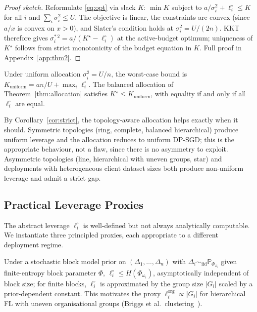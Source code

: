 \begin{proof}[Proof sketch]
Reformulate \eqref{eq:opt} via slack $K$:
$\min K$ subject to $a/\sigma_i^2 + \ell_i^\circ \leq K$ for all $i$
and $\sum_i \sigma_i^2 \leq U$. The objective is linear, the constraints
are convex (since $a/x$ is convex on $x>0$), and Slater's condition
holds at $\sigma_i^2 = U/(2n)$. KKT therefore gives
$\sigma_i^{*\,2} = a/(K^\star - \ell_i^\circ)$ at the active-budget
optimum; uniqueness of $K^\star$ follows from strict monotonicity of
the budget equation in $K$. Full proof in Appendix~\ref{app:thm2}.
\end{proof}

\begin{corollary}
\label{cor:strict}
Under uniform allocation $\sigma_i^2 = U/n$, the worst-case bound is
$K_{\mathrm{uniform}} = an/U + \max_i \ell_i^\circ$. The balanced allocation of
Theorem~\ref{thm:allocation} satisfies
\(K^\star \leq K_{\mathrm{uniform}}\), with equality if and only if all
$\ell_i^\circ$ are equal.
\end{corollary}

By Corollary~\ref{cor:strict}, the topology-aware allocation helps
exactly when it should. Symmetric topologies (ring, complete, balanced hierarchical) produce
uniform leverage and the allocation reduces to uniform DP-SGD; this is
the appropriate behaviour, not a flaw, since there is no asymmetry to
exploit. Asymmetric topologies (line, hierarchical with uneven groups,
star) and deployments with heterogeneous client dataset sizes both
produce non-uniform leverage and admit a strict gap.

\subsection{Practical Leverage Proxies}
\label{sec:defense-proxies}

The abstract leverage $\ell_i^\circ$ is well-defined but not always
analytically computable. We instantiate three principled proxies, each
appropriate to a different deployment regime.

\begin{corollary}
\label{cor:sbm}
Under a stochastic block model prior on $(\Delta_1,\ldots,\Delta_n)$
with $\Delta_i \sim_{\text{iid}} \mathbb{P}_{\Phi_{\omega_i}}$ given
finite-entropy block parameter $\Phi$,
\(\ell_i^\circ \leq H(\Phi_{\omega_i})\),
asymptotically independent of block size; for finite blocks,
$\ell_i^\circ$ is approximated by the group size $|G_i|$ scaled by a
prior-dependent constant. This motivates the proxy
$\ell_i^{\mathrm{org}} \propto |G_i|$ for hierarchical FL with uneven
organisational groups (\eg Briggs et al.\ clustering~\cite{briggs2020hierarchical}).
\end{corollary}

